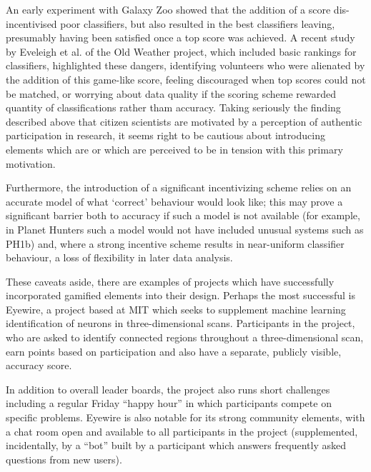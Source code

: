 \documentclass{ar2e}
\begin{document}
An early experiment with Galaxy Zoo showed that the addition of a score
dis-incentivised poor classifiers, but also resulted in the best classifiers
leaving, presumably having been satisfied once a top score was achieved. A
recent study by Eveleigh et al. of the Old Weather project, which included
basic rankings for classifiers, highlighted these dangers, identifying
volunteers who were alienated by the addition of this game-like score, feeling
discouraged when top scores could not be matched, or worrying about data
quality if the scoring scheme rewarded quantity of classifications rather tham
accuracy. Taking seriously the finding described above that citizen scientists
are motivated by a perception of authentic participation in research, it seems
right to be cautious about introducing elements which are or which are
perceived to be in tension with this primary motivation. 


Furthermore, the
introduction of a significant incentivizing scheme relies on an accurate model
of what `correct' behaviour would look like; this may prove a significant
barrier both to accuracy if such a model is not available (for example, in
Planet Hunters such a model would not have included unusual systems such as
PH1b) and, where a strong incentive scheme results in near-uniform classifier
behaviour, a loss of flexibility in later data analysis. 

These caveats aside, there are examples of projects which have successfully
incorporated gamified elements into their design. Perhaps the most successful
is Eyewire, a project based at MIT which seeks to supplement machine learning
identification of neurons in three-dimensional scans. Participants in the
project, who are asked to identify connected regions throughout a
three-dimensional scan, earn points based on participation and also have a
separate, publicly visible, accuracy score. 


In addition to overall leader
boards, the project also runs short challenges including a regular Friday
``happy hour'' in which participants compete on specific problems. Eyewire is
also notable for its strong community elements, with a chat room open and
available to all participants in the project (supplemented, incidentally, by a
``bot'' built by a participant which answers frequently asked questions from new
users). 
\end{document}
